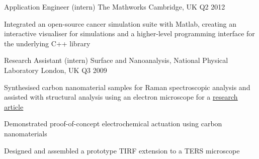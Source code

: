 \begin{cventries}
  \cventry
    {Application Engineer (intern)} %
    {The Mathworks} %
    {Cambridge, UK} %
    {Q2 2012} %
    {
      \begin{cvitems} %
        \item {Integrated an open-source cancer simulation suite with Matlab, creating an interactive visualiser for simulations and a higher-level programming interface for the underlying C++ library}
      \end{cvitems}
    }

  \cventry
    {Research Assistant (intern)} %
    {Surface and Nanoanalysis, National Physical Laboratory} %
    {London, UK} %
    {Q3 2009} %
    {
      \begin{cvitems} %
        \item {Synthesised carbon nanomaterial samples for Raman spectroscopic analysis and assisted with structural analysis using an electron microscope for a \href{https://doi.org/10.1016/j.cplett.2008.09.044}{\underline{research article}}}
        \item {Demonstrated proof-of-concept electrochemical actuation using carbon nanomaterials}
        \item {Designed and assembled a prototype TIRF extension to a TERS microscope}
      \end{cvitems}
    }

\end{cventries}